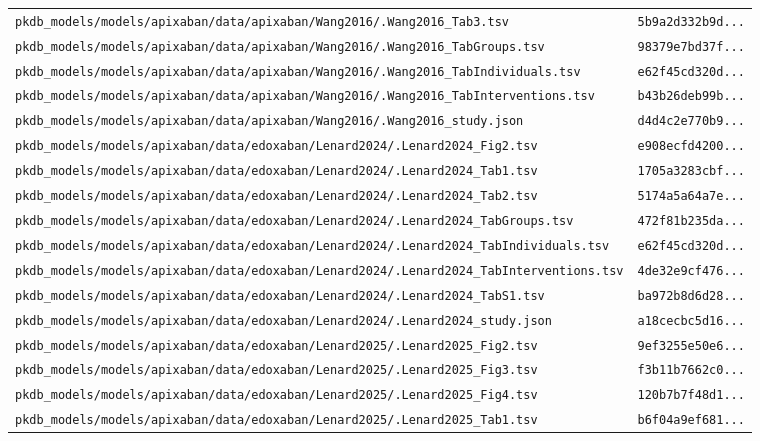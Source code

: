 \begin{longtable}{ll}
\texttt{pkdb\_models/models/apixaban/data/apixaban/Wang2016/.Wang2016\_Tab3.tsv} & \texttt{5b9a2d332b9d...} \\
\texttt{pkdb\_models/models/apixaban/data/apixaban/Wang2016/.Wang2016\_TabGroups.tsv} & \texttt{98379e7bd37f...} \\
\texttt{pkdb\_models/models/apixaban/data/apixaban/Wang2016/.Wang2016\_TabIndividuals.tsv} & \texttt{e62f45cd320d...} \\
\texttt{pkdb\_models/models/apixaban/data/apixaban/Wang2016/.Wang2016\_TabInterventions.tsv} & \texttt{b43b26deb99b...} \\
\texttt{pkdb\_models/models/apixaban/data/apixaban/Wang2016/.Wang2016\_study.json} & \texttt{d4d4c2e770b9...} \\
\texttt{pkdb\_models/models/apixaban/data/edoxaban/Lenard2024/.Lenard2024\_Fig2.tsv} & \texttt{e908ecfd4200...} \\
\texttt{pkdb\_models/models/apixaban/data/edoxaban/Lenard2024/.Lenard2024\_Tab1.tsv} & \texttt{1705a3283cbf...} \\
\texttt{pkdb\_models/models/apixaban/data/edoxaban/Lenard2024/.Lenard2024\_Tab2.tsv} & \texttt{5174a5a64a7e...} \\
\texttt{pkdb\_models/models/apixaban/data/edoxaban/Lenard2024/.Lenard2024\_TabGroups.tsv} & \texttt{472f81b235da...} \\
\texttt{pkdb\_models/models/apixaban/data/edoxaban/Lenard2024/.Lenard2024\_TabIndividuals.tsv} & \texttt{e62f45cd320d...} \\
\texttt{pkdb\_models/models/apixaban/data/edoxaban/Lenard2024/.Lenard2024\_TabInterventions.tsv} & \texttt{4de32e9cf476...} \\
\texttt{pkdb\_models/models/apixaban/data/edoxaban/Lenard2024/.Lenard2024\_TabS1.tsv} & \texttt{ba972b8d6d28...} \\
\texttt{pkdb\_models/models/apixaban/data/edoxaban/Lenard2024/.Lenard2024\_study.json} & \texttt{a18cecbc5d16...} \\
\texttt{pkdb\_models/models/apixaban/data/edoxaban/Lenard2025/.Lenard2025\_Fig2.tsv} & \texttt{9ef3255e50e6...} \\
\texttt{pkdb\_models/models/apixaban/data/edoxaban/Lenard2025/.Lenard2025\_Fig3.tsv} & \texttt{f3b11b7662c0...} \\
\texttt{pkdb\_models/models/apixaban/data/edoxaban/Lenard2025/.Lenard2025\_Fig4.tsv} & \texttt{120b7b7f48d1...} \\
\texttt{pkdb\_models/models/apixaban/data/edoxaban/Lenard2025/.Lenard2025\_Tab1.tsv} & \texttt{b6f04a9ef681...} \\

\end{longtable}
